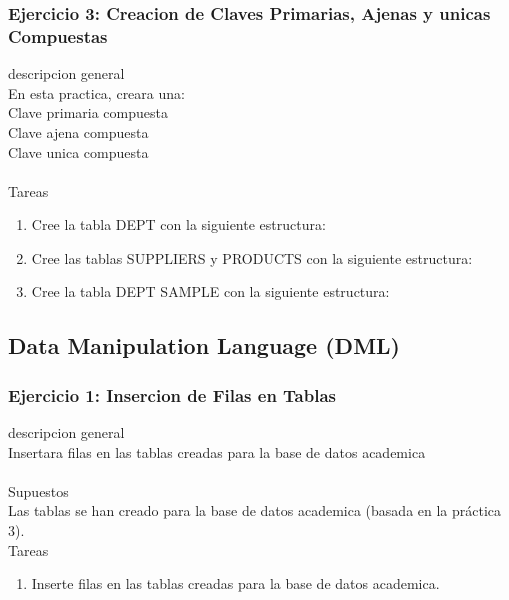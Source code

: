 \documentclass[12pt,letterpaper]{article}
\begin{document}
	
	
	\subsubsection{Ejercicio 3: Creacion de Claves Primarias, Ajenas y unicas Compuestas} 
descripcion general  \\
En esta practica, creara una:\\
Clave primaria compuesta\\
Clave ajena compuesta\\
Clave unica compuesta\\
 \\

Tareas\\
\begin{enumerate}[1.]
    \item  Cree la tabla DEPT con la siguiente estructura:  
     
    \item Cree las tablas SUPPLIERS y PRODUCTS con la siguiente estructura:
    
    \item Cree la tabla DEPT SAMPLE con la siguiente estructura:
    
   
    
		\end{enumerate} 
		




\newpage
\subsection{Data Manipulation Language (DML)} 

		\subsubsection{Ejercicio 1: Insercion de Filas en Tablas} 
descripcion general  \\
Insertara filas en las tablas creadas para la base de datos academica\\
 \\
Supuestos\\
Las tablas se han creado para la base de datos academica (basada en la práctica 3).\\


Tareas\\
\begin{enumerate}[1.]
    \item Inserte filas en las tablas creadas para la base de datos academica.  
     
    
    
		\end{enumerate} 
		
\end{document}
